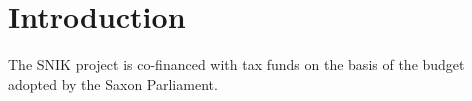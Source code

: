\documentclass[sw]{iosart2x}
\begin{document}
\section{Introduction}\label{sec:introduction}




\begin{ack}
The SNIK project is co-financed with tax funds on the basis of the budget adopted by the Saxon Parliament.
\end{ack}

\nocite{*}


\end{document}
